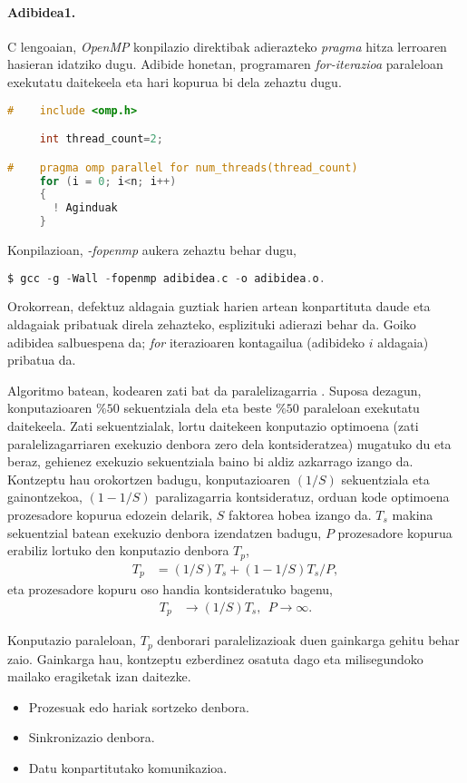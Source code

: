 \paragraph*{\textbf{Adibidea1.}} C lengoaian, \emph{OpenMP} konpilazio direktibak adierazteko \emph{pragma} hitza lerroaren hasieran idatziko dugu. Adibide honetan, programaren \emph{for-iterazioa} paraleloan exekutatu daitekeela  eta hari kopurua bi dela zehaztu dugu. 

\begin{lstlisting}[language=C]
#    include <omp.h>

     int thread_count=2;

#    pragma omp parallel for num_threads(thread_count) 
     for (i = 0; i<n; i++)
     {
       ! Aginduak 
     }
\end{lstlisting}

Konpilazioan, \emph{-fopenmp} aukera zehaztu behar dugu,
\begin{lstlisting}[language=C]
$ gcc -g -Wall -fopenmp adibidea.c -o adibidea.o.
\end{lstlisting}
Orokorrean, defektuz aldagaia guztiak harien artean konpartituta daude eta aldagaiak pribatuak direla zehazteko, esplizituki adierazi behar da. Goiko adibidea salbuespena da; \emph{for} iterazioaren kontagailua  (adibideko $i$ aldagaia) pribatua da.

Algoritmo batean, kodearen zati bat  da paralelizagarria \cite{Pacheco2011}. Suposa dezagun, konputazioaren $\%50$ sekuentziala dela eta beste $\%50$ paraleloan exekutatu daitekeela. Zati sekuentzialak, lortu daitekeen konputazio optimoena (zati paralelizagarriaren exekuzio denbora zero dela kontsideratzea) mugatuko du eta beraz, gehienez exekuzio sekuentziala baino bi aldiz azkarrago izango da. 
Kontzeptu hau orokortzen badugu, konputazioaren $(1/S)$ sekuentziala eta gainontzekoa, $(1-1/S)$ paralizagarria kontsideratuz, orduan kode optimoena prozesadore kopurua edozein delarik, $S$ faktorea hobea izango da. $T_s$ makina sekuentzial batean exekuzio denbora izendatzen badugu, $P$ prozesadore kopurua erabiliz lortuko den konputazio denbora $T_p$,
\begin{align*}
T_p &=(1/S)T_s + (1-1/S)T_s/P,
\end{align*}
eta prozesadore kopuru oso handia kontsideratuko bagenu,
\begin{align*}
T_p &\rightarrow (1/S) T_s ,  \ \ P \rightarrow \infty.
\end{align*} 

Konputazio paraleloan, $T_p$ denborari paralelizazioak duen gainkarga gehitu behar zaio. Gainkarga hau, kontzeptu ezberdinez osatuta dago eta milisegundoko mailako eragiketak izan daitezke.  
\begin{itemize}
\item Prozesuak edo hariak sortzeko denbora.
\item Sinkronizazio denbora.
\item Datu konpartitutako komunikazioa.
\end{itemize}

